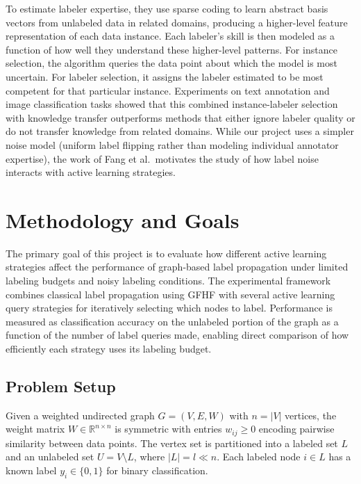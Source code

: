 \documentclass{article}
\begin{document}
To estimate labeler expertise, they use sparse coding to learn abstract basis vectors from unlabeled data in related domains, producing a higher-level feature representation of each data instance. Each labeler's skill is then modeled as a function of how well they understand these higher-level patterns. For instance selection, the algorithm queries the data point about which the model is most uncertain. For labeler selection, it assigns the labeler estimated to be most competent for that particular instance. Experiments on text annotation and image classification tasks showed that this combined instance-labeler selection with knowledge transfer outperforms methods that either ignore labeler quality or do not transfer knowledge from related domains. While our project uses a simpler noise model (uniform label flipping rather than modeling individual annotator expertise), the work of Fang et al.\ motivates the study of how label noise interacts with active learning strategies.

\section{Methodology and Goals}

The primary goal of this project is to evaluate how different active learning strategies affect the performance of graph-based label propagation under limited labeling budgets and noisy labeling conditions. The experimental framework combines classical label propagation using GFHF with several active learning query strategies for iteratively selecting which nodes to label. Performance is measured as classification accuracy on the unlabeled portion of the graph as a function of the number of label queries made, enabling direct comparison of how efficiently each strategy uses its labeling budget.

\subsection{Problem Setup}

Given a weighted undirected graph $G = (V, E, W)$ with $n = |V|$ vertices, the weight matrix $W \in \mathbb{R}^{n \times n}$ is symmetric with entries $w_{ij} \geq 0$ encoding pairwise similarity between data points. The vertex set is partitioned into a labeled set $L$ and an unlabeled set $U = V \setminus L$, where $|L| = l \ll n$. Each labeled node $i \in L$ has a known label $y_i \in \{0, 1\}$ for binary classification.
\end{document}
